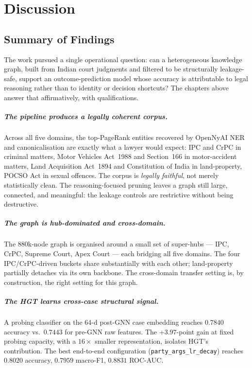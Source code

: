 \chapter{Discussion}
\label{chap:discussion}

\section{Summary of Findings}

The work pursued a single operational question: can a heterogeneous knowledge graph, built from Indian court judgments and filtered to be structurally leakage-safe, support an outcome-prediction model whose accuracy is attributable to legal reasoning rather than to identity or decision shortcuts? The chapters above answer that affirmatively, with qualifications.

\paragraph{The pipeline produces a legally coherent corpus.} Across all five domains, the top-PageRank entities recovered by OpenNyAI NER and canonicalisation are exactly what a lawyer would expect: IPC and CrPC in criminal matters, Motor Vehicles Act~1988 and Section~166 in motor-accident matters, Land Acquisition Act~1894 and Constitution of India in land-property, POCSO Act in sexual offences. The corpus is \emph{legally faithful}, not merely statistically clean. The reasoning-focused pruning leaves a graph still large, connected, and meaningful: the leakage controls are restrictive without being destructive.

\paragraph{The graph is hub-dominated and cross-domain.} The 880k-node graph is organised around a small set of super-hubs --- IPC, CrPC, Supreme Court, Apex Court --- each bridging all five domains. The four IPC/CrPC-driven buckets share substantially with each other; land-property partially detaches via its own backbone. The cross-domain transfer setting is, by construction, the right setting for this graph.

\paragraph{The HGT learns cross-case structural signal.} A probing classifier on the 64-d post-GNN case embedding reaches $0.7840$ accuracy vs.\ $0.7443$ for pre-GNN raw features. The $+3.97$-point gain at fixed probing capacity, with a $16\times$ smaller representation, isolates HGT's contribution. The best end-to-end configuration (\texttt{party\_args\_lr\_decay}) reaches $0.8020$ accuracy, $0.7959$ macro-F1, $0.8831$ ROC-AUC.

